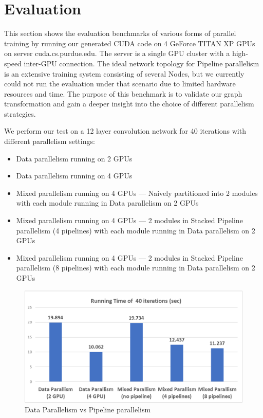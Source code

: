 \documentclass[sigplan, nonacm]{acmart}\settopmatter{printfolios=true,printccs=false,printacmref=false}
\begin{document}
 \section{Evaluation}\label{evaluation}
 This section shows the evaluation benchmarks of various forms of parallel training by running our generated CUDA code on 4 GeForce TITAN XP GPUs on server cuda.cs.purdue.edu. The server is a single GPU cluster with a high-speed inter-GPU connection. The ideal network topology for Pipeline parallelism is an extensive training system consisting of several Nodes, but we currently could not run the evaluation under that scenario due to limited hardware resources and time. The purpose of this benchmark is to validate our graph transformation and gain a deeper insight into the choice of different parallelism strategies.\par
 We perform our test on a 12 layer convolution network for 40 iterations with different parallelism settings:
 \begin{itemize}
   \item Data parallelism running on 2 GPUs
   \item Data parallelism running on 4 GPUs
   \item Mixed parallelism running on 4 GPUs --- Naively partitioned into 2 modules with each module running in Data parallelism on 2 GPUs
   \item Mixed parallelism running on 4 GPUs --- 2 modules in Stacked Pipeline parallelism (4 pipelines) with each module running in Data parallelism on 2 GPUs
   \item Mixed parallelism running on 4 GPUs --- 2 modules in Stacked Pipeline parallelism (8 pipelines) with each module running in Data parallelism on 2 GPUs
 \end{itemize}
 \begin{figure}[htbp]
  \centering
  \includegraphics[scale=0.5]{pipelineparallelruntime.png}
  \caption{Data Parallelism vs Pipeline parallelism}
  \label{fig:runtime}
\end{figure}
\end{document}
